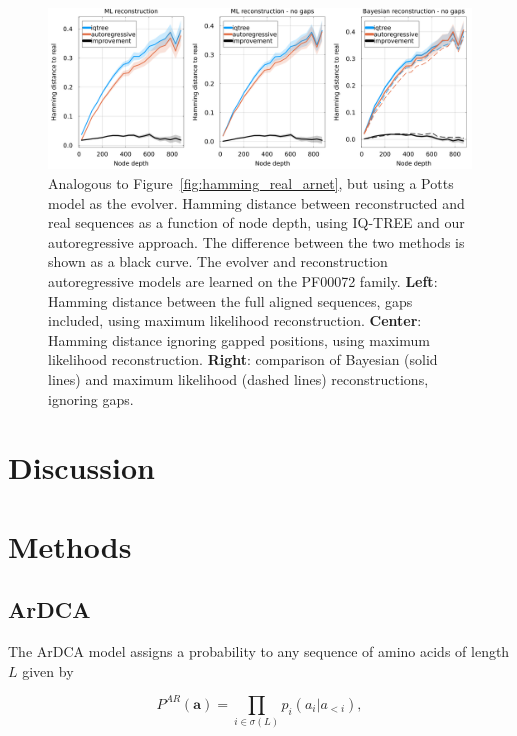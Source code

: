 \begin{figure}
	\centering
	\includegraphics[width = \textwidth]{figures/hamming_to_real_potts_PF00072.png}
	\caption{
		Analogous to Figure~\ref{fig:hamming_real_arnet}, but using a Potts model as the evolver. 
		Hamming distance between reconstructed and real sequences as a function of node depth, using IQ-TREE and our autoregressive approach. 
		The difference between the two methods is shown as a black curve. 
		The evolver and reconstruction autoregressive models are learned on the PF00072 family. 
		\textbf{Left}: Hamming distance between the full aligned sequences, gaps included, using maximum likelihood reconstruction.  	
		\textbf{Center}: Hamming distance ignoring gapped positions, using maximum likelihood reconstruction. 
		\textbf{Right}: comparison of Bayesian (solid lines) and maximum likelihood (dashed lines) reconstructions, ignoring gaps. 
	}
	\label{fig:hamming_real_potts}
\end{figure}


\section{Discussion}

\section{Methods} %
\label{sub:methods}

\subsection{ArDCA}

The ArDCA model assigns a probability to any sequence of amino acids of length $L$ given by 

\begin{equation}
	\label{eq:autoregressive_def_methods}
	P^{AR}(\mathbf{a}) = \prod_{i \in \sigma(L)} p_i(a_i \vert a_{<i}),
\end{equation}

